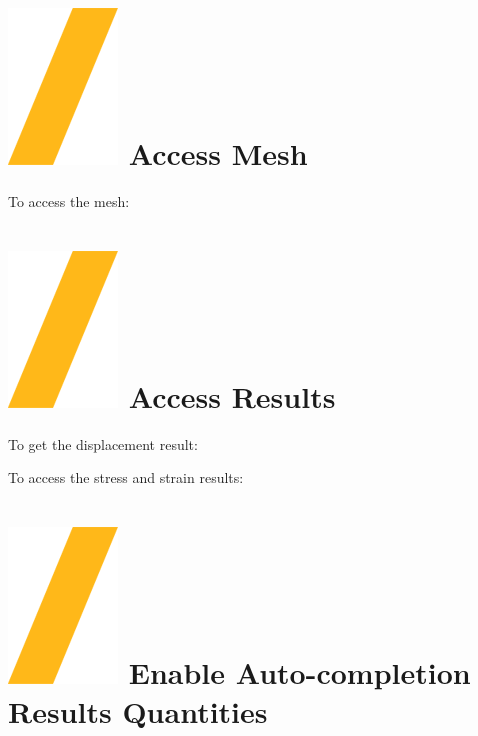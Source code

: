 \documentclass[9pt,landscape]{article}
\begin{document}
\begin{multicols}{3}
\section{\includegraphics[height=\fontcharht\font`\S]{slash.png} Access Mesh}

To access the mesh:


\section{\includegraphics[height=\fontcharht\font`\S]{slash.png} Access Results}

To get the displacement result:


To access the stress and strain results:



\vfill

\section{\includegraphics[height=\fontcharht\font`\S]{slash.png} Enable Auto-completion Results Quantities}


\end{multicols}
\end{document}
